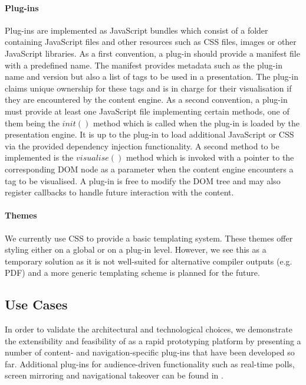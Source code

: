 \documentclass[a4paper,12pt]{report}
\begin{document}
     \paragraph{Plug-ins} Plug-ins are implemented as JavaScript bundles which
      consist of a folder containing JavaScript files and other resources such
      as CSS files, images or other JavaScript libraries. As a first
      convention, a plug-in should provide a manifest file with a predefined
      name. The manifest provides metadata such as the plug-in name and version
      but also a list of tags to be used in a presentation. The plug-in claims
      unique ownership for these tags and is in charge for their visualisation
      if they are encountered by the content engine. As a second convention, a
      plug-in must provide at least one JavaScript file implementing certain
      methods, one of them being the $init()$ method which is called when the
      plug-in is loaded by the presentation engine. It is up to the plug-in to
      load additional JavaScript or CSS via the provided dependency injection
      functionality. A second method to be implemented is the $visualise()$
      method which is invoked with a pointer to the corresponding DOM node as a
      parameter when the content engine encounters a tag to be visualised. A
      plug-in is free to modify the DOM tree and may also register callbacks to
      handle future interaction with the content.

     \paragraph{Themes} We currently use CSS to provide a basic templating
      system. These themes offer styling either on a global or on a plug-in
      level. However, we see this as a temporary solution as it is not
      well-suited for alternative compiler outputs (e.g. PDF) and a more
      generic templating scheme is planned for the future.

   \subsection{Use Cases}

    In order to validate the architectural and technological choices, we
    demonstrate the extensibility and feasibility of \mxp as a rapid
    prototyping platform by presenting a number of content- and
    navigation-specific plug-ins that have been developed so far. Additional
    plug-ins for audience-driven functionality such as real-time polls, screen
    mirroring and navigational takeover can be found in \citep{roels-2}.
\end{document}

